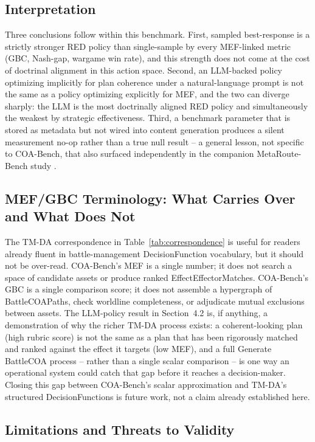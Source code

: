 \documentclass[letterpaper]{article} %
\begin{document}
\subsection{Interpretation}

Three conclusions follow within this benchmark. First, sampled best-response is a strictly stronger RED policy than single-sample by every MEF-linked metric (GBC, Nash-gap, wargame win rate), and this strength does not come at the cost of doctrinal alignment in this action space. Second, an LLM-backed policy optimizing implicitly for plan coherence under a natural-language prompt is not the same as a policy optimizing explicitly for MEF, and the two can diverge sharply: the LLM is the most doctrinally aligned RED policy and simultaneously the weakest by strategic effectiveness. Third, a benchmark parameter that is stored as metadata but not wired into content generation produces a silent measurement no-op rather than a true null result -- a general lesson, not specific to COA-Bench, that also surfaced independently in the companion MetaRoute-Bench study \citep{vidra2026metaroute}.

\subsection{MEF/GBC Terminology: What Carries Over and What Does Not}

The TM-DA correspondence in Table~\ref{tab:correspondence} is useful for readers already fluent in battle-management DecisionFunction vocabulary, but it should not be over-read. COA-Bench's MEF is a single number; it does not search a space of candidate assets or produce ranked EffectEffectorMatches. COA-Bench's GBC is a single comparison score; it does not assemble a hypergraph of BattleCOAPaths, check worldline completeness, or adjudicate mutual exclusions between assets. The LLM-policy result in Section~4.2 is, if anything, a demonstration of why the richer TM-DA process exists: a coherent-looking plan (high rubric score) is not the same as a plan that has been rigorously matched and ranked against the effect it targets (low MEF), and a full Generate BattleCOA process -- rather than a single scalar comparison -- is one way an operational system could catch that gap before it reaches a decision-maker. Closing this gap between COA-Bench's scalar approximation and TM-DA's structured DecisionFunctions is future work, not a claim already established here.

\subsection{Limitations and Threats to Validity}
\label{sec:limitations}
\end{document}

